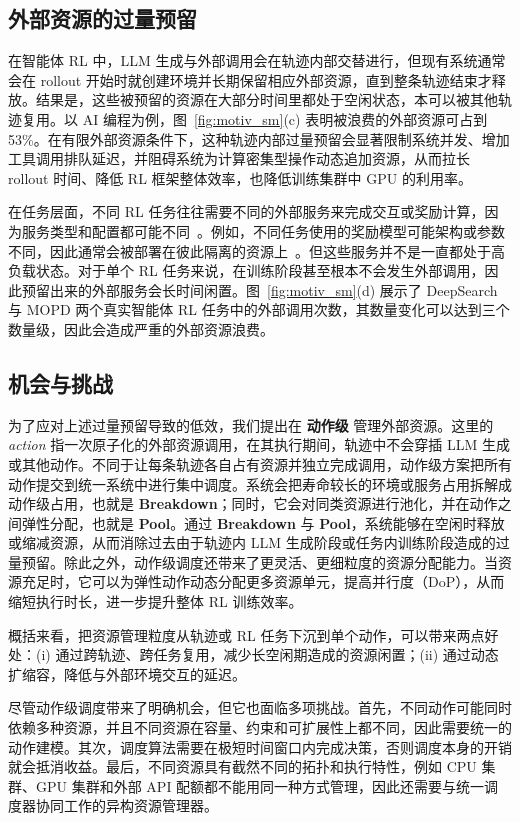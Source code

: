 \subsection{外部资源的过量预留}
\label{sec:background_op}

在智能体 RL 中，LLM 生成与外部调用会在轨迹内部交替进行，但现有系统通常会在 rollout 开始时就创建环境并长期保留相应外部资源，直到整条轨迹结束才释放。结果是，这些被预留的资源在大部分时间里都处于空闲状态，本可以被其他轨迹复用。以 AI 编程为例，图~\ref{fig:motiv_sm}(c) 表明被浪费的外部资源可占到 53\%。在有限外部资源条件下，这种轨迹内部过量预留会显著限制系统并发、增加工具调用排队延迟，并阻碍系统为计算密集型操作动态追加资源，从而拉长 rollout 时间、降低 RL 框架整体效率，也降低训练集群中 GPU 的利用率。

在任务层面，不同 RL 任务往往需要不同的外部服务来完成交互或奖励计算，因为服务类型和配置都可能不同~\citep{li2025cuda,jin2025search,xiao2026mimo}。例如，不同任务使用的奖励模型可能架构或参数不同，因此通常会被部署在彼此隔离的资源上~\citep{micromulti,jiang2025verltool}。但这些服务并不是一直都处于高负载状态。对于单个 RL 任务来说，在训练阶段甚至根本不会发生外部调用，因此预留出来的外部服务会长时间闲置。图~\ref{fig:motiv_sm}(d) 展示了 DeepSearch 与 MOPD 两个真实智能体 RL 任务中的外部调用次数，其数量变化可以达到三个数量级，因此会造成严重的外部资源浪费。

\subsection{机会与挑战}
\label{sec:background_opp}

为了应对上述过量预留导致的低效，我们提出在 \textbf{动作级} 管理外部资源。这里的 \textit{action} 指一次原子化的外部资源调用，在其执行期间，轨迹中不会穿插 LLM 生成或其他动作。不同于让每条轨迹各自占有资源并独立完成调用，动作级方案把所有动作提交到统一系统中进行集中调度。系统会把寿命较长的环境或服务占用拆解成动作级占用，也就是 \textbf{Breakdown}；同时，它会对同类资源进行池化，并在动作之间弹性分配，也就是 \textbf{Pool}。通过 \textbf{Breakdown} 与 \textbf{Pool}，系统能够在空闲时释放或缩减资源，从而消除过去由于轨迹内 LLM 生成阶段或任务内训练阶段造成的过量预留。除此之外，动作级调度还带来了更灵活、更细粒度的资源分配能力。当资源充足时，它可以为弹性动作动态分配更多资源单元，提高并行度（DoP），从而缩短执行时长，进一步提升整体 RL 训练效率。

概括来看，把资源管理粒度从轨迹或 RL 任务下沉到单个动作，可以带来两点好处：(i) 通过跨轨迹、跨任务复用，减少长空闲期造成的资源闲置；(ii) 通过动态扩缩容，降低与外部环境交互的延迟。

尽管动作级调度带来了明确机会，但它也面临多项挑战。首先，不同动作可能同时依赖多种资源，并且不同资源在容量、约束和可扩展性上都不同，因此需要统一的动作建模。其次，调度算法需要在极短时间窗口内完成决策，否则调度本身的开销就会抵消收益。最后，不同资源具有截然不同的拓扑和执行特性，例如 CPU 集群、GPU 集群和外部 API 配额都不能用同一种方式管理，因此还需要与统一调度器协同工作的异构资源管理器。
